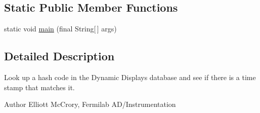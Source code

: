 \subsection*{Static Public Member Functions}
\begin{DoxyCompactItemize}
\item 
static void \hyperlink{classgov_1_1fnal_1_1ppd_1_1dd_1_1util_1_1TranslateGITHashCodeToDate_ac2a7337fcc7e9fee3a2aece2322570bb}{main} (final String\mbox{[}$\,$\mbox{]} args)
\end{DoxyCompactItemize}


\subsection{Detailed Description}
Look up a hash code in the Dynamic Displays database and see if there is a time stamp that matches it.

\begin{DoxyAuthor}{Author}
Elliott Mc\-Crory, Fermilab A\-D/\-Instrumentation 
\end{DoxyAuthor}


